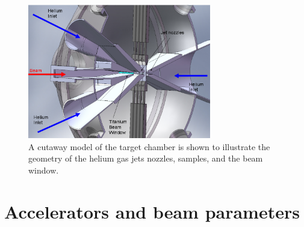 \documentclass[final,3p,times,twocolumn]{elsarticle} %
\begin{document}
\begin{figure}[htbp]
\begin{center}
\includegraphics[width=80mm]{Figures/Cutaway.png}
\caption{A cutaway model of the target chamber is shown to illustrate the geometry of the helium gas jets nozzles, samples, and the beam window.}
\label{fig:Cutaway}
\end{center}
\end{figure}





\section{Accelerators and beam parameters}

\end{document}
